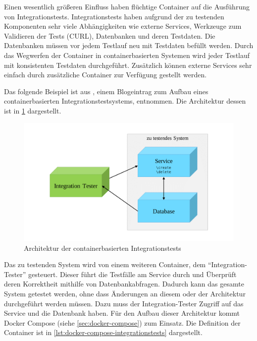 Einen wesentlich größeren Einfluss haben flüchtige Container auf die Ausführung von Integrationstests.
Integrationstests haben aufgrund der zu testenden Komponenten sehr viele Abhängigkeiten wie externe Services, Werkzeuge zum Validieren der Tests (CURL), Datenbanken und deren Testdaten.
Die Datenbanken müssen vor jedem Testlauf neu mit Testdaten befüllt werden.
Durch das Wegwerfen der Container in containerbasierten Systemen wird jeder Testlauf mit konsistenten Testdaten durchgeführt.
Zusätzlich können externe Services sehr einfach durch zusätzliche Container zur Verfügung gestellt werden.

Das folgende Beispiel ist aus \autocite{docker-integration-testing:online}, einem Blogeintrag zum Aufbau eines containerbasierten Integrationstestsystems, entnommen. Die Architektur dessen ist in \cref{fig:containerbasierte-integrationstests} dargestellt.

\begin{figure}[htbp]
    \centering
    \includegraphics[width=0.7\linewidth,clip,trim=100 30 100 30]{images/containerbasierte-integrationstests}
    \caption{Architektur der containerbasierten Integrationstests}
\label{fig:containerbasierte-integrationstests}
\end{figure}
Das zu testenden System wird von einem weiteren Container, dem "`Integration-Tester"' gesteuert.
Dieser führt die Testfälle am Service durch und Überprüft deren Korrektheit mithilfe von Datenbankabfragen.
Dadurch kann das gesamte System getestet werden, ohne dass Änderungen an diesem oder der Architektur durchgeführt werden müssen.
Dazu muss der Integration-Tester Zugriff auf das Service und die Datenbank haben.
Für den Aufbau dieser Architektur kommt Docker Compose (siehe \cref{sec:docker-compose}) zum Einsatz.
Die Definition der Container ist in \cref{lst:docker-compose-integrationstests} dargestellt.

